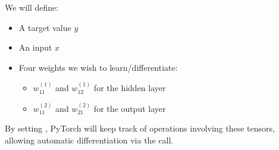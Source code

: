 \documentclass[letterpaper,10pt,english]{jupyterBook}
\begin{document}
\sphinxAtStartPar
We will define:
\begin{itemize}
\item {} 
\sphinxAtStartPar
A target value \(y\)

\item {} 
\sphinxAtStartPar
An input \(x\)

\item {} 
\sphinxAtStartPar
Four weights we wish to learn/differentiate:
\begin{itemize}
\item {} 
\sphinxAtStartPar
\(w_{11}^{(1)}\) and \(w_{12}^{(1)}\) for the hidden layer

\item {} 
\sphinxAtStartPar
\(w_{11}^{(2)}\) and \(w_{21}^{(2)}\) for the output layer

\end{itemize}

\end{itemize}

\sphinxAtStartPar
By setting , PyTorch will keep track of operations involving these tensors, allowing automatic differentiation via the  call.
\end{document}
